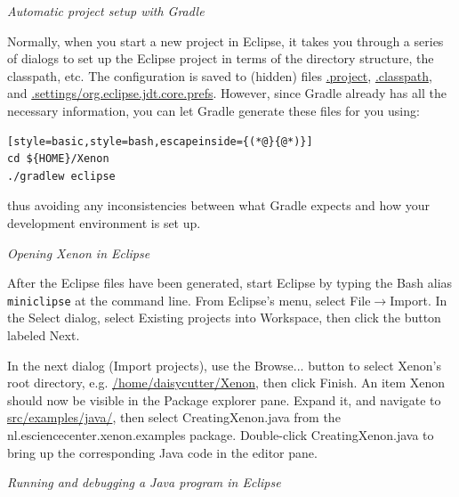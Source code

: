 \documentclass[12pt, a4paper, twoside,openany,titlepage]{article}
\begin{document}
{\needspace{4em}
\vspace{2em}
\textit{Automatic project setup with Gradle}

Normally, when you start a new project in Eclipse, it takes you through a series of dialogs to set up the Eclipse project in terms of the directory structure, the classpath, etc. The configuration is saved to (hidden) files \url{.project}, \url{.classpath}, and \url{.settings/org.eclipse.jdt.core.prefs}. However, since Gradle already has all the necessary information, you can let Gradle generate these files for you using:
\begin{lstlisting}[style=basic,style=bash,escapeinside={(*@}{@*)}]
cd ${HOME}/Xenon
./gradlew eclipse
\end{lstlisting} %
thus avoiding any inconsistencies between what Gradle expects and how your development environment is set up.

\vspace{2em}
\textit{Opening Xenon in Eclipse}

After the Eclipse files have been generated, start Eclipse by typing the Bash alias \texttt{miniclipse} at the command line. From Eclipse's menu, select \textsf{File}$\rightarrow$\textsf{Import}. In the \textsf{Select} dialog, select \textsf{Existing projects into Workspace}, then click the button labeled \textsf{Next}.

In the next dialog (\textsf{Import projects}), use the \textsf{Browse...} button to select Xenon's root directory, e.g. \url{/home/daisycutter/Xenon}, then click \textsf{Finish}. An item \textsf{Xenon} should now be visible in the \textsf{Package explorer} pane. Expand it, and navigate to \url{src/examples/java/}, then select \textsf{CreatingXenon.java} from the \textsf{nl.esciencecenter.xenon.examples} package. Double-click \textsf{CreatingXenon.java} to bring up the corresponding Java code in the editor pane.

\vspace{2em}
\textit{Running and debugging a Java program in Eclipse}


}
\end{document}
